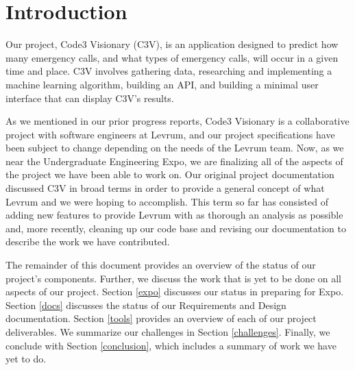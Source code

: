 \documentclass[onecolumn, draftclsnofoot,10pt, compsoc]{IEEEtran}
\begin{document}
\newpage
{}
\tableofcontents
\listoffigures
\listoftables
\lstlistoflistings
\clearpage

\section{Introduction}
\begin{singlespace}
Our project, Code3 Visionary (C3V), is an application designed to predict how many emergency calls, and what types of emergency calls, will occur in a given time and place. 
C3V involves gathering data, researching and implementing a machine learning algorithm, building an API, and building a minimal user interface that can display C3V's results. 

As we mentioned in our prior progress reports, Code3 Visionary is a collaborative project with software engineers at Levrum, and our project specifications have been subject to change depending on the needs of the Levrum team. 
Now, as we near the Undergraduate Engineering Expo, we are finalizing all of the aspects of the project we have been able to work on.
Our original project documentation discussed C3V in broad terms in order to provide a general concept of what Levrum and we were hoping to accomplish. 
This term so far has consisted of adding new features to provide Levrum with as thorough an analysis as possible and, more recently, cleaning up our code base and revising our documentation to describe the work we have contributed. 

The remainder of this document provides an overview of the status of our project's components.
Further, we discuss the work that is yet to be done on all aspects of our project.
Section \ref{expo} discusses our status in preparing for Expo.
Section \ref{docs} discusses the status of our Requirements and Design documentation.
Section \ref{tools} provides an overview of each of our project deliverables. 
We summarize our challenges in Section \ref{challenges}.
Finally, we conclude with Section \ref{conclusion}, which includes a summary of work we have yet to do.

\end{singlespace}
\end{document}
